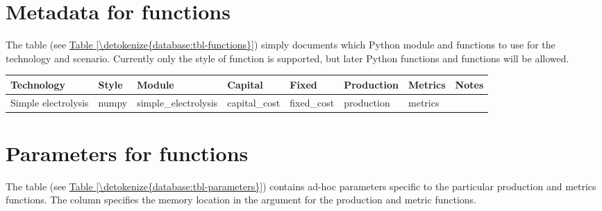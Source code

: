 \documentclass[letterpaper,10pt,english]{sphinxmanual}
\begin{document}
\section{Metadata for functions}
\label{\detokenize{database:metadata-for-functions}}
The  table (see \hyperref[\detokenize{database:tbl-functions}]{Table \ref{\detokenize{database:tbl-functions}}}) simply documents which
Python module and functions to use for the technology and scenario.
Currently only the  style of function is supported, but later
 Python functions and  functions will be allowed.


\begin{savenotes}\sphinxattablestart
\centering
{}
\sphinxthecaptionisattop
{}\label{\detokenize{database:table-3}}\label{\detokenize{database:tbl-functions}}
\sphinxaftertopcaption
\begin{tabulary}{\linewidth}[t]{|T|T|T|T|T|T|T|T|}
\hline
\sphinxstyletheadfamily 
Technology
&\sphinxstyletheadfamily 
Style
&\sphinxstyletheadfamily 
Module
&\sphinxstyletheadfamily 
Capital
&\sphinxstyletheadfamily 
Fixed
&\sphinxstyletheadfamily 
Production
&\sphinxstyletheadfamily 
Metrics
&\sphinxstyletheadfamily 
Notes
\\
\hline
Simple electrolysis
&
numpy
&
simple\_electrolysis
&
capital\_cost
&
fixed\_cost
&
production
&
metrics
&\\
\hline
\end{tabulary}
\par
\sphinxattableend\end{savenotes}


\section{Parameters for functions}
\label{\detokenize{database:parameters-for-functions}}
The  table (see \hyperref[\detokenize{database:tbl-parameters}]{Table \ref{\detokenize{database:tbl-parameters}}}) contains ad-hoc
parameters specific to the particular production and metrics functions.
The  column specifies the memory location in the argument for
the production and metric functions.
\end{document}
